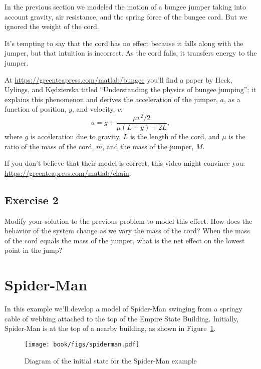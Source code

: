 
In the previous section we modeled the motion of a bungee jumper taking into account gravity, air resistance, and the spring force of the bungee cord.  But we ignored the weight of the cord.


It's tempting to say that the cord has no effect because it falls along with the jumper, but that intuition is incorrect.  As the cord falls, it transfers energy to the jumper.


At \url{https://greenteapress.com/matlab/bungee} you'll find a paper by Heck, Uylings, and Kędzierska titled ``Understanding the physics of bungee jumping''; it explains this phenomenon and derives the acceleration of the jumper, $a$, as a function of position, $y$, and velocity, $v$:
%
\[ a = g + \frac{\mu v^2/2}{\mu(L+y) + 2L}, \] 
%
where $g$ is acceleration due to gravity, $L$ is the length of the cord, and $\mu$ is the ratio of the mass of the cord, $m$, and the mass of the jumper, $M$.

If you don't believe that their model is correct, this video might convince you: \url{https://greenteapress.com/matlab/chain}.

\subsection{Exercise 2}

Modify your solution to the previous problem to model this effect.  How does the behavior of the system change as we vary the mass of the cord?  When the mass of the cord equals the mass of the jumper, what is the net effect on the lowest point in the jump?


\section{Spider-Man}

In this example we'll develop a model of Spider-Man swinging from a
springy cable of webbing attached to the top of the Empire State
Building.  Initially, Spider-Man is at the top of a nearby building, as
shown in Figure~\ref{spiderman}.


\begin{figure}
\centerline{\texttt{[image: book/figs/spiderman.pdf]}}
\caption{Diagram of the initial state for the Spider-Man example}
\label{spiderman}
\end{figure}

